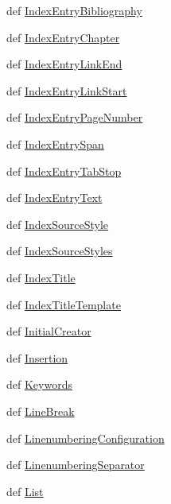 \begin{DoxyCompactItemize}
def \hyperlink{namespaceodf_1_1text_a33e93f12c7fe6d16ba8c017bde3d622f}{Index\+Entry\+Bibliography}
\item 
def \hyperlink{namespaceodf_1_1text_a1a3fae84d6b451c4cde23a06ecb33996}{Index\+Entry\+Chapter}
\item 
def \hyperlink{namespaceodf_1_1text_a517074bf8ff6730e796f43614331f138}{Index\+Entry\+Link\+End}
\item 
def \hyperlink{namespaceodf_1_1text_a29e710e9968db8a623f2eab251d73c32}{Index\+Entry\+Link\+Start}
\item 
def \hyperlink{namespaceodf_1_1text_a06256f814cf787e8bd413765ac5a7061}{Index\+Entry\+Page\+Number}
\item 
def \hyperlink{namespaceodf_1_1text_ae85206698003936db4407c3c9eb2098c}{Index\+Entry\+Span}
\item 
def \hyperlink{namespaceodf_1_1text_a012960839853da1b20eaa7ac5891aedd}{Index\+Entry\+Tab\+Stop}
\item 
def \hyperlink{namespaceodf_1_1text_ac8a466f1a74e3faeeda0220e6def1eda}{Index\+Entry\+Text}
\item 
def \hyperlink{namespaceodf_1_1text_a948cdbaabb352f55467db450733fdb29}{Index\+Source\+Style}
\item 
def \hyperlink{namespaceodf_1_1text_a04f6519c19007f0e11a259811a289f38}{Index\+Source\+Styles}
\item 
def \hyperlink{namespaceodf_1_1text_a4a5ad697d363c316151c40608dd0bd70}{Index\+Title}
\item 
def \hyperlink{namespaceodf_1_1text_ad14807df958cbed2c25fa62ff805c6b6}{Index\+Title\+Template}
\item 
def \hyperlink{namespaceodf_1_1text_a2063c2ec0d28bec6586a70e753f8b109}{Initial\+Creator}
\item 
def \hyperlink{namespaceodf_1_1text_a3bbb56c0f085d0e4cfbcf9df3ac050b7}{Insertion}
\item 
def \hyperlink{namespaceodf_1_1text_a0942e2e79d899f6af892fb213093a18b}{Keywords}
\item 
def \hyperlink{namespaceodf_1_1text_a21dbe100d6bb85cacb054da9d22cce34}{Line\+Break}
\item 
def \hyperlink{namespaceodf_1_1text_ad5276b3a67b6c44cd694b283ed249867}{Linenumbering\+Configuration}
\item 
def \hyperlink{namespaceodf_1_1text_a55a87e196bc2c681c5851322c7846978}{Linenumbering\+Separator}
\item 
def \hyperlink{namespaceodf_1_1text_a5ffb5667060b8dc26a1e3b992d3b8545}{List}
\item 

\end{DoxyCompactItemize}
